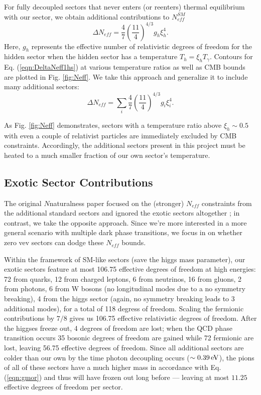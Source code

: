 \documentclass[nofootinbib,twocolumn,preprintnumbers]{revtex4-2}
\begin{document}
For fully decoupled sectors that never enters (or reenters) thermal equilibrium with our sector, we obtain additional contributions to $N^{SM}_{eff}$ \cite{Breitbach:2018ddu}
\begin{equation}\label{eqn:DeltaNeff1hs}
\Delta N_{eff} = \frac{4}{7}\left(\frac{11}{4}\right)^{4/3}g_h \xi_h^4.
\end{equation} 
Here, $g_h$ represents the effective number of relativistic degrees of freedom for the hidden sector when the hidden sector has a temperature $T_h = \xi_h T_\gamma$. Contours for Eq. (\ref{eqn:DeltaNeff1hs}) at various temperature ratios as well as CMB bounds are plotted in Fig. \ref{fig:Neff}. We take this approach and generalize it to include many additional sectors:
\begin{equation}\label{eqn:DeltaNeff}
\Delta N_{eff} = \sum_i \frac{4}{7}\left(\frac{11}{4}\right)^{4/3}g_{i} \xi^4_{i}.
\end{equation} 

As Fig. \ref{fig:Neff} demonstrates, sectors with a temperature ratio above $\xi_h\sim 0.5$ with even a couple of relativist particles are immediately excluded by CMB constraints. Accordingly, the additional sectors present in this project must be heated to a much smaller fraction of our own sector's temperature. 

\subsection{Exotic Sector Contributions}

The original $N$naturalness paper focused on the (stronger) $N_{eff}$ constraints from the additional standard sectors and ignored the exotic sectors altogether \cite{Arkani-Hamed:2016rle}; in contrast, we take the opposite approach. Since we're more interested in a more general scenario with multiple dark phase transitions, we focus in on whether zero vev sectors can dodge these $N_{eff}$ bounds.

Within the framework of SM-like sectors (save the higgs mass parameter), our exotic sectors feature at most 106.75 effective degrees of freedom at high energies: 72 from quarks,  12 from charged leptons, 6 from neutrinos, 16 from gluons, 2 from photons, 6 from W bosons (no longitudinal modes due to a no symmetry breaking), 4 from the higgs sector (again, no symmetry breaking leads to 3 additional modes), for a total of 118 degress of freedom. Scaling the fermionic contributions by $7/8$ gives us 106.75 effective relativistic degrees of freedom.  After the higgses freeze out, 4 degrees of freedom are lost; when the QCD phase transition occurs 35 bosonic degrees of freedom are gained while 72 fermionic are lost, leaving 56.75 effective degrees of freedom. Since all additional sectors are colder than our own by the time photon decoupling occurs ($\sim 0.39 \,{\rm eV}$), the pions of all of these sectors have a much higher mass in accordance with Eq. (\ref{eqn:gmor}) and thus will have frozen out long before --- leaving at most $11.25$ effective degrees of freedom per sector.
\end{document}
